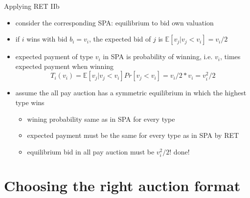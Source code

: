 \documentclass[bigger]{beamer}
\begin{document}
\begin{frame}[label={sec:org6175575}]{Applying RET IIb}
\begin{itemize}
\item consider the corresponding SPA: equilibrium to bid own valuation
\item if \(i\) wins with bid \(b_i=v_i\), the expected bid of \(j\) is \(\mathbb{E}[v_j|v_j<v_i]=v_i/2\)
\item expected payment of type \(v_i\) in SPA is probability of winning, i.e. \(v_i\), times expected payment when winning
$$T_i(v_i)=\mathbb{E}[v_j|v_j<v_i]Pr[v_j<v_i]=v_i/2 * v_i=v_i^2/2$$
\item assume the all pay auction has a symmetric equilibrium in which the highest type wins
\begin{itemize}
\item wining probability same as in SPA for every type
\item expected payment must be the same for every type as in SPA by RET
\item equilibrium bid in all pay auction must be \(v_i^2/2\)! done!
\end{itemize}
\end{itemize}
\end{frame}

\section{Choosing the right auction format}
\label{sec:orgbd5f19a}
\end{document}
